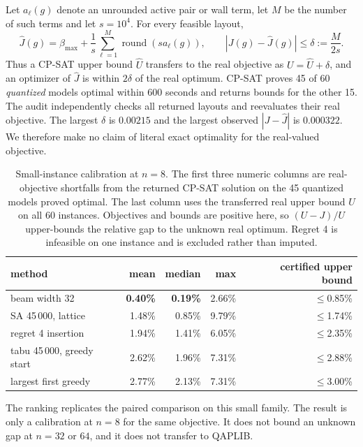 \documentclass[preprint,12pt,authoryear]{elsarticle}
\begin{document}
Let $a_\ell(g)$ denote an unrounded active pair or wall term, let $M$ be the
number of such terms and let $s=10^4$.
For every feasible layout,
\begin{equation}
 \widehat J(g)=\beta_{\max}+\frac{1}{s}
 \sum_{\ell=1}^{M}\operatorname{round}(s a_\ell(g)),
 \qquad |J(g)-\widehat J(g)|\le\delta:=\frac{M}{2s}.
\label{eq:quantbound}
\end{equation}
Thus a CP-SAT upper bound $\widehat U$ transfers to the real objective as
$U=\widehat U+\delta$, and an optimizer of $\widehat J$ is within $2\delta$ of
the real optimum. CP-SAT proves 45 of 60 \emph{quantized} models optimal within
600 seconds and returns bounds for the other 15. The audit independently checks
all returned layouts and reevaluates their real objective. The largest
$\delta$ is $0.00215$ and the largest observed $|J-\widehat J|$ is $0.000322$.
We therefore make no claim of literal exact optimality for the real-valued
objective.

\begin{table}[t]
\centering
\caption{Small-instance calibration at $n=8$. The first three numeric columns
are real-objective shortfalls from the returned CP-SAT solution on the 45
quantized models proved optimal. The last column uses the transferred real upper
bound $U$ on all 60 instances. Objectives and bounds are positive here, so
$(U-J)/U$ upper-bounds the relative gap to the unknown real optimum. Regret 4 is
infeasible on one instance and is excluded rather than imputed.}
\label{tab:gaps}
\small
\setlength{\tabcolsep}{4pt}
\begin{tabular}{@{}lrrrr@{}}
\toprule
method & mean & median & max & certified upper bound \\
\midrule
beam width 32          & \textbf{0.40\%} & \textbf{0.19\%} & 2.66\% & $\le$0.85\% \\
SA 45\,000, lattice    & 1.48\% & 0.85\% & 9.79\% & $\le$1.74\% \\
regret 4 insertion     & 1.94\% & 1.41\% & 6.05\% & $\le$2.35\% \\
tabu 45\,000, greedy start & 2.62\% & 1.96\% & 7.31\% & $\le$2.88\% \\
largest first greedy   & 2.77\% & 2.13\% & 7.31\% & $\le$3.00\% \\
\bottomrule
\end{tabular}
\end{table}

The ranking replicates the paired comparison on this small family. The result is
only a calibration at $n=8$ for the same objective. It does not bound an unknown
gap at $n=32$ or $64$, and it does not transfer to QAPLIB.
\end{document}

